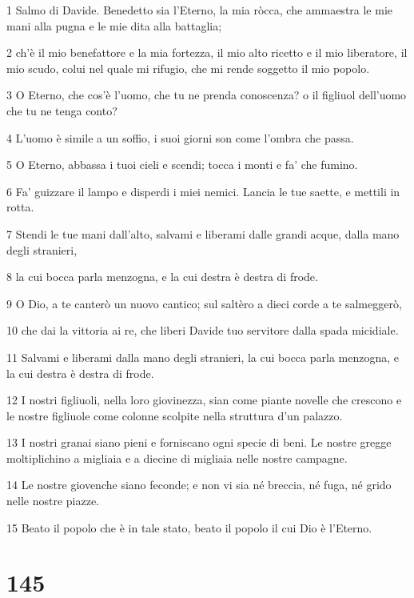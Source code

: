 \par 1 Salmo di Davide. Benedetto sia l'Eterno, la mia ròcca, che ammaestra le mie mani alla pugna e le mie dita alla battaglia;
\par 2 ch'è il mio benefattore e la mia fortezza, il mio alto ricetto e il mio liberatore, il mio scudo, colui nel quale mi rifugio, che mi rende soggetto il mio popolo.
\par 3 O Eterno, che cos'è l'uomo, che tu ne prenda conoscenza? o il figliuol dell'uomo che tu ne tenga conto?
\par 4 L'uomo è simile a un soffio, i suoi giorni son come l'ombra che passa.
\par 5 O Eterno, abbassa i tuoi cieli e scendi; tocca i monti e fa' che fumino.
\par 6 Fa' guizzare il lampo e disperdi i miei nemici. Lancia le tue saette, e mettili in rotta.
\par 7 Stendi le tue mani dall'alto, salvami e liberami dalle grandi acque, dalla mano degli stranieri,
\par 8 la cui bocca parla menzogna, e la cui destra è destra di frode.
\par 9 O Dio, a te canterò un nuovo cantico; sul saltèro a dieci corde a te salmeggerò,
\par 10 che dai la vittoria ai re, che liberi Davide tuo servitore dalla spada micidiale.
\par 11 Salvami e liberami dalla mano degli stranieri, la cui bocca parla menzogna, e la cui destra è destra di frode.
\par 12 I nostri figliuoli, nella loro giovinezza, sian come piante novelle che crescono e le nostre figliuole come colonne scolpite nella struttura d'un palazzo.
\par 13 I nostri granai siano pieni e forniscano ogni specie di beni. Le nostre gregge moltiplichino a migliaia e a diecine di migliaia nelle nostre campagne.
\par 14 Le nostre giovenche siano feconde; e non vi sia né breccia, né fuga, né grido nelle nostre piazze.
\par 15 Beato il popolo che è in tale stato, beato il popolo il cui Dio è l'Eterno.

\chapter{145}

